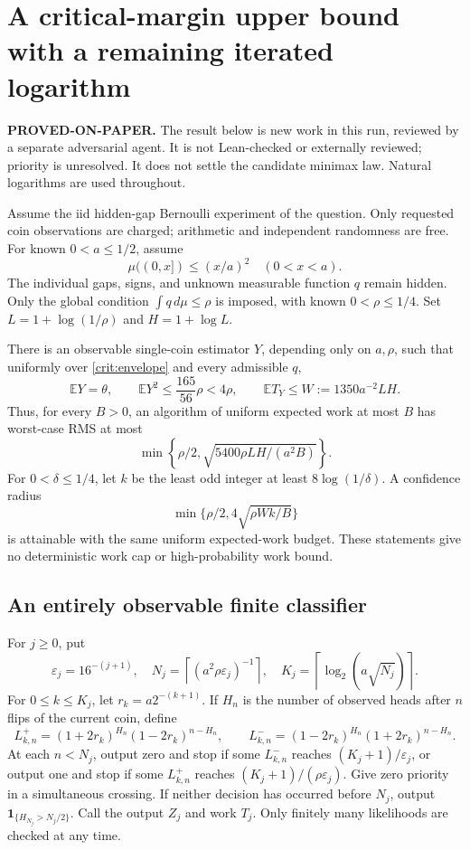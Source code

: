 \section{A critical-margin upper bound with a remaining iterated logarithm}
\label{sec:critical}
\noindent\textbf{PROVED-ON-PAPER.} The result below is new work in this run,
reviewed by a separate adversarial agent. It is not Lean-checked or externally
reviewed; priority is unresolved. It does not settle the candidate minimax law.
Natural logarithms are used throughout.

Assume the iid hidden-gap Bernoulli experiment of the question. Only requested
coin observations are charged; arithmetic and independent randomness are free.
For known $0<a\le1/2$, assume
\begin{equation}\label{crit:envelope}
 \mu((0,x])\le(x/a)^2\quad(0<x<a).
\end{equation}
The individual gaps, signs, and unknown measurable function $q$ remain hidden.
Only the global condition $\int q\,d\mu\le\rho$ is imposed, with known
$0<\rho\le1/4$. Set $L=1+\log(1/\rho)$ and $H=1+\log L$.

\begin{theorem}\label{crit:theorem}
There is an observable single-coin estimator $Y$, depending only on $a,\rho$,
such that uniformly over \eqref{crit:envelope} and every admissible $q$,
\[
 \mathbb EY=\theta,\qquad
 \mathbb EY^2\le\frac{165}{56}\rho<4\rho,\qquad
 \mathbb ET_Y\le W:=1350a^{-2}LH.
\]
Thus, for every $B>0$, an algorithm of uniform expected work at most $B$ has
worst-case RMS at most
\[
 \min\left\{\rho/2,\sqrt{5400\rho LH/(a^2B)}\right\}.
\]
For $0<\delta\le1/4$, let $k$ be the least odd integer at least
$8\log(1/\delta)$. A confidence radius
\[
 \min\{\rho/2,4\sqrt{\rho Wk/B}\}
\]
is attainable with the same uniform expected-work budget. These statements
give no deterministic work cap or high-probability work bound.
\end{theorem}

\subsection{An entirely observable finite classifier}
For $j\ge0$, put
\[
 \varepsilon_j=16^{-(j+1)},\quad
 N_j=\left\lceil(a^2\rho\varepsilon_j)^{-1}\right\rceil,\quad
 K_j=\left\lceil\log_2(a\sqrt{N_j})\right\rceil.
\]
For $0\le k\le K_j$, let $r_k=a2^{-(k+1)}$. If $H_n$ is the number of
observed heads after $n$ flips of the current coin, define
\[
 L^+_{k,n}=(1+2r_k)^{H_n}(1-2r_k)^{n-H_n},\qquad
 L^-_{k,n}=(1-2r_k)^{H_n}(1+2r_k)^{n-H_n}.
\]
At each $n<N_j$, output zero and stop if some $L^-_{k,n}$ reaches
$(K_j+1)/\varepsilon_j$, or output one and stop if some $L^+_{k,n}$ reaches
$(K_j+1)/(\rho\varepsilon_j)$. Give zero priority in a simultaneous crossing.
If neither decision has occurred before $N_j$, output
$\mathbf1_{\{H_{N_j}>N_j/2\}}$. Call the output $Z_j$ and work $T_j$.
Only finitely many likelihoods are checked at any time.

